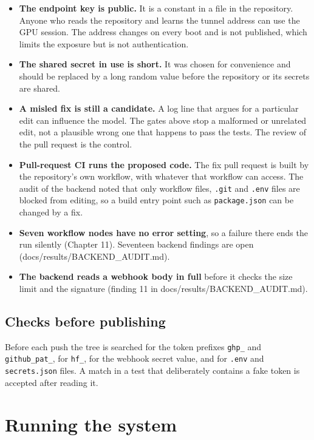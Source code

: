 \documentclass[11pt,a4paper]{report}
\begin{document}
\begin{itemize}[leftmargin=*,itemsep=2pt]
\item \textbf{The endpoint key is public.} It is a constant in a file in the repository. Anyone who reads the repository and learns the tunnel address can use the GPU session. The address changes on every boot and is not published, which limits the exposure but is not authentication.
\item \textbf{The shared secret in use is short.} It was chosen for convenience and should be replaced by a long random value before the repository or its secrets are shared.
\item \textbf{A misled fix is still a candidate.} A log line that argues for a particular edit can influence the model. The gates above stop a malformed or unrelated edit, not a plausible wrong one that happens to pass the tests. The review of the pull request is the control.
\item \textbf{Pull-request CI runs the proposed code.} The fix pull request is built by the repository's own workflow, with whatever that workflow can access. The audit of the backend noted that only workflow files, \texttt{.\allowbreak{}git} and \texttt{.\allowbreak{}env} files are blocked from editing, so a build entry point such as \texttt{package.\allowbreak{}json} can be changed by a fix.
\item \textbf{Seven workflow nodes have no error setting}, so a failure there ends the run silently (Chapter 11). Seventeen backend findings are open (docs/results/BACKEND\_AUDIT.md).
\item \textbf{The backend reads a webhook body in full} before it checks the size limit and the signature (finding 11 in docs/results/BACKEND\_AUDIT.md).
\end{itemize}

\section{Checks before publishing}

Before each push the tree is searched for the token prefixes \texttt{ghp\_\allowbreak{}} and \texttt{github\_\allowbreak{}pat\_\allowbreak{}}, for \texttt{hf\_\allowbreak{}}, for the webhook secret value, and for \texttt{.\allowbreak{}env} and \texttt{secrets.\allowbreak{}json} files. A match in a test that deliberately contains a fake token is accepted after reading it.

\chapter{Running the system}
\end{document}
